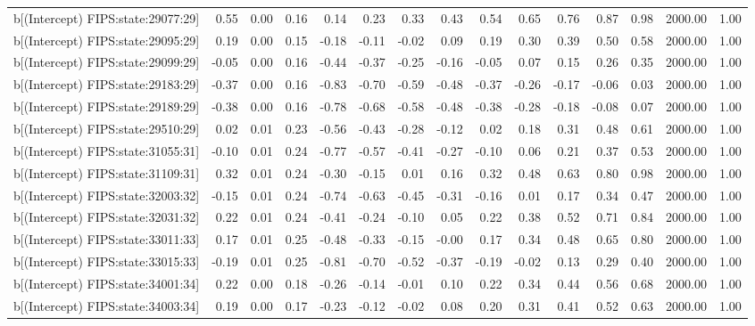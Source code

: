 \begin{table}[ht]
\begin{tabular}{rrrrrrrrrrrrrrr}
  b[(Intercept) FIPS:state:29077:29] & 0.55 & 0.00 & 0.16 & 0.14 & 0.23 & 0.33 & 0.43 & 0.54 & 0.65 & 0.76 & 0.87 & 0.98 & 2000.00 & 1.00 \\ 
  b[(Intercept) FIPS:state:29095:29] & 0.19 & 0.00 & 0.15 & -0.18 & -0.11 & -0.02 & 0.09 & 0.19 & 0.30 & 0.39 & 0.50 & 0.58 & 2000.00 & 1.00 \\ 
  b[(Intercept) FIPS:state:29099:29] & -0.05 & 0.00 & 0.16 & -0.44 & -0.37 & -0.25 & -0.16 & -0.05 & 0.07 & 0.15 & 0.26 & 0.35 & 2000.00 & 1.00 \\ 
  b[(Intercept) FIPS:state:29183:29] & -0.37 & 0.00 & 0.16 & -0.83 & -0.70 & -0.59 & -0.48 & -0.37 & -0.26 & -0.17 & -0.06 & 0.03 & 2000.00 & 1.00 \\ 
  b[(Intercept) FIPS:state:29189:29] & -0.38 & 0.00 & 0.16 & -0.78 & -0.68 & -0.58 & -0.48 & -0.38 & -0.28 & -0.18 & -0.08 & 0.07 & 2000.00 & 1.00 \\ 
  b[(Intercept) FIPS:state:29510:29] & 0.02 & 0.01 & 0.23 & -0.56 & -0.43 & -0.28 & -0.12 & 0.02 & 0.18 & 0.31 & 0.48 & 0.61 & 2000.00 & 1.00 \\ 
  b[(Intercept) FIPS:state:31055:31] & -0.10 & 0.01 & 0.24 & -0.77 & -0.57 & -0.41 & -0.27 & -0.10 & 0.06 & 0.21 & 0.37 & 0.53 & 2000.00 & 1.00 \\ 
  b[(Intercept) FIPS:state:31109:31] & 0.32 & 0.01 & 0.24 & -0.30 & -0.15 & 0.01 & 0.16 & 0.32 & 0.48 & 0.63 & 0.80 & 0.98 & 2000.00 & 1.00 \\ 
  b[(Intercept) FIPS:state:32003:32] & -0.15 & 0.01 & 0.24 & -0.74 & -0.63 & -0.45 & -0.31 & -0.16 & 0.01 & 0.17 & 0.34 & 0.47 & 2000.00 & 1.00 \\ 
  b[(Intercept) FIPS:state:32031:32] & 0.22 & 0.01 & 0.24 & -0.41 & -0.24 & -0.10 & 0.05 & 0.22 & 0.38 & 0.52 & 0.71 & 0.84 & 2000.00 & 1.00 \\ 
  b[(Intercept) FIPS:state:33011:33] & 0.17 & 0.01 & 0.25 & -0.48 & -0.33 & -0.15 & -0.00 & 0.17 & 0.34 & 0.48 & 0.65 & 0.80 & 2000.00 & 1.00 \\ 
  b[(Intercept) FIPS:state:33015:33] & -0.19 & 0.01 & 0.25 & -0.81 & -0.70 & -0.52 & -0.37 & -0.19 & -0.02 & 0.13 & 0.29 & 0.40 & 2000.00 & 1.00 \\ 
  b[(Intercept) FIPS:state:34001:34] & 0.22 & 0.00 & 0.18 & -0.26 & -0.14 & -0.01 & 0.10 & 0.22 & 0.34 & 0.44 & 0.56 & 0.68 & 2000.00 & 1.00 \\ 
  b[(Intercept) FIPS:state:34003:34] & 0.19 & 0.00 & 0.17 & -0.23 & -0.12 & -0.02 & 0.08 & 0.20 & 0.31 & 0.41 & 0.52 & 0.63 & 2000.00 & 1.00 \\ 

\end{tabular}
\end{table}
